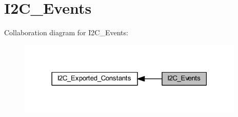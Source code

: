 \hypertarget{group___i2_c___events}{}\section{I2\+C\+\_\+\+Events}
\label{group___i2_c___events}
Collaboration diagram for I2\+C\+\_\+\+Events\+:
\nopagebreak
\begin{figure}[H]
\begin{center}
\leavevmode
\includegraphics[width=306pt]{group___i2_c___events}
\end{center}
\end{figure}
